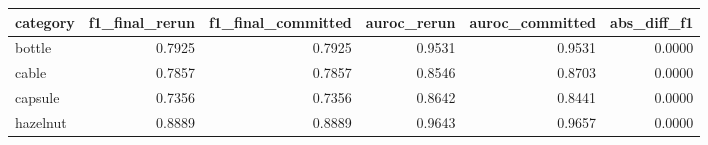 \begin{tabular}{lrrrrr}
\toprule
category &  f1\_final\_rerun &  f1\_final\_committed &  auroc\_rerun &  auroc\_committed &  abs\_diff\_f1 \\
\midrule
  bottle &          0.7925 &              0.7925 &       0.9531 &           0.9531 &       0.0000 \\
   cable &          0.7857 &              0.7857 &       0.8546 &           0.8703 &       0.0000 \\
 capsule &          0.7356 &              0.7356 &       0.8642 &           0.8441 &       0.0000 \\
hazelnut &          0.8889 &              0.8889 &       0.9643 &           0.9657 &       0.0000 \\
\bottomrule
\end{tabular}

